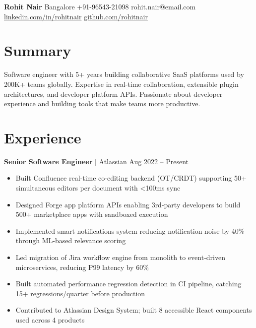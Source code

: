 \documentclass[10pt,a4paper]{article}
\begin{document}
{\large\bfseries Rohit Nair}  {\small Bangalore}  {\small +91-96543-21098}  {\small rohit.nair@email.com}\\[2pt]
{\color{accent}} {\small \href{https://linkedin.com/in/rohitnair}{linkedin.com/in/rohitnair}}  {\small \href{https://github.com/rohitnair}{github.com/rohitnair}}


\section{Summary}

{\small Software engineer with 5+ years building collaborative SaaS platforms used by 200K+ teams globally. Expertise in real-time collaboration, extensible plugin architectures, and developer platform APIs. Passionate about developer experience and building tools that make teams more productive.}

\section{Experience}

\textbf{Senior Software Engineer} $\mid$ Atlassian \hfill {\small Aug 2022 -- Present}
\begin{itemize}
    \item Built Confluence real-time co-editing backend (OT/CRDT) supporting 50+ simultaneous editors per document with <100ms sync
    \item Designed Forge app platform APIs enabling 3rd-party developers to build 500+ marketplace apps with sandboxed execution
    \item Implemented smart notifications system reducing notification noise by 40\% through ML-based relevance scoring
    \item Led migration of Jira workflow engine from monolith to event-driven microservices, reducing P99 latency by 60\%
    \item Built automated performance regression detection in CI pipeline, catching 15+ regressions/quarter before production
    \item Contributed to Atlassian Design System; built 8 accessible React components used across 4 products
\end{itemize}
\end{document}
